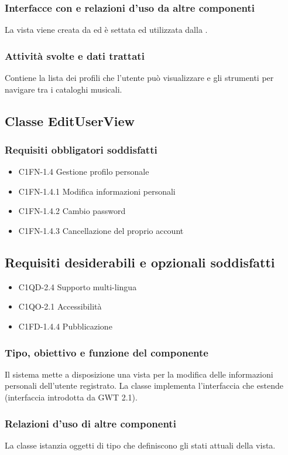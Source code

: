 \subsubsection*{Interfacce con e relazioni d'uso da altre componenti}
 La vista viene creata da  ed \`e settata ed utilizzata dalla
 .
 \subsubsection*{Attivit\`a svolte e dati trattati}
Contiene la lista dei profili che l'utente pu\`o visualizzare e gli strumenti
per navigare tra i cataloghi musicali.

\subsection{Classe EditUserView}
\subsubsection*{Requisiti obbligatori soddisfatti}
\begin{itemize}
	\item C1FN-1.4 Gestione profilo personale
	\item C1FN-1.4.1 Modifica informazioni personali
	\item C1FN-1.4.2 Cambio password
	\item C1FN-1.4.3 Cancellazione del proprio account
\end{itemize}
\subsection*{Requisiti desiderabili e opzionali soddisfatti}
\begin{itemize}
    \item C1QD-2.4 Supporto multi-lingua
    \item C1QO-2.1 Accessibilit\`a
    \item C1FD-1.4.4 Pubblicazione
\end{itemize}
\subsubsection*{Tipo, obiettivo e funzione del componente}
Il sistema mette a disposizione una vista per la
modifica delle informazioni personali dell'utente registrato. La classe
 implementa l'interfaccia  che estende
 (interfaccia introdotta da GWT 2.1).
\subsubsection*{Relazioni d'uso di altre componenti}
La classe istanzia oggetti di tipo  che definiscono gli stati
attuali della vista.
